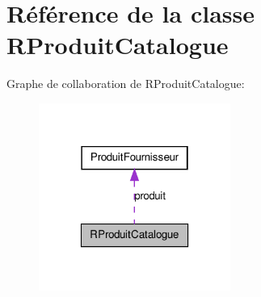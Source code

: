 \hypertarget{class_r_produit_catalogue}{
\section{Référence de la classe RProduitCatalogue}
\label{db/dc5/class_r_produit_catalogue}
}


Graphe de collaboration de RProduitCatalogue:\nopagebreak
\begin{figure}[H]
\begin{center}
\leavevmode
\includegraphics[width=178pt]{d7/d58/class_r_produit_catalogue__coll__graph}
\end{center}
\end{figure}
